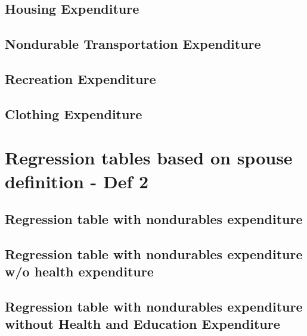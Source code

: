 \documentclass[a4paper,landscape]{article}
\begin{document}
\subsection{Housing Expenditure}

\clearpage

\subsection{Nondurable Transportation Expenditure}

\clearpage

\subsection{Recreation Expenditure}

\clearpage

\subsection{Clothing Expenditure}

\clearpage


\section{Regression tables based on spouse definition - Def 2}

\subsection{Regression table with nondurables expenditure}

\clearpage

\subsection{Regression table with nondurables expenditure w/o health expenditure} 

\clearpage

\subsection{Regression table with nondurables expenditure without Health and Education Expenditure}

\clearpage
\end{document}
